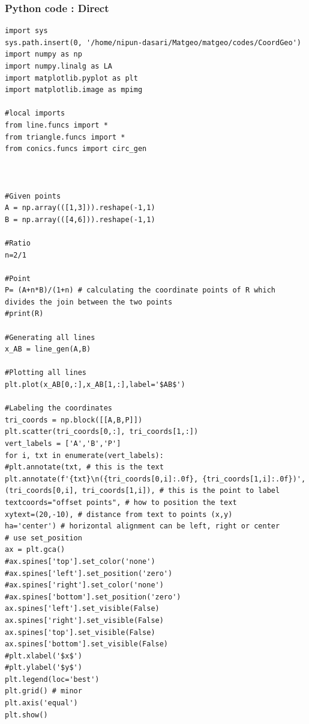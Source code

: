\documentclass{beamer}
\begin{document}
	\begin{frame}[fragile]
	\frametitle{Python code : Direct }
	
	\begin{lstlisting}
import sys                                          
sys.path.insert(0, '/home/nipun-dasari/Matgeo/matgeo/codes/CoordGeo')       
import numpy as np
import numpy.linalg as LA
import matplotlib.pyplot as plt
import matplotlib.image as mpimg

#local imports
from line.funcs import *
from triangle.funcs import *
from conics.funcs import circ_gen



#Given points
A = np.array(([1,3])).reshape(-1,1)
B = np.array(([4,6])).reshape(-1,1)

#Ratio
n=2/1

#Point
P= (A+n*B)/(1+n) # calculating the coordinate points of R which divides the join between the two points
#print(R)

#Generating all lines
x_AB = line_gen(A,B)

#Plotting all lines
plt.plot(x_AB[0,:],x_AB[1,:],label='$AB$')

#Labeling the coordinates
tri_coords = np.block([[A,B,P]])
plt.scatter(tri_coords[0,:], tri_coords[1,:])
vert_labels = ['A','B','P']
for i, txt in enumerate(vert_labels):
#plt.annotate(txt, # this is the text
plt.annotate(f'{txt}\n({tri_coords[0,i]:.0f}, {tri_coords[1,i]:.0f})',
(tri_coords[0,i], tri_coords[1,i]), # this is the point to label
textcoords="offset points", # how to position the text
xytext=(20,-10), # distance from text to points (x,y)
ha='center') # horizontal alignment can be left, right or center
# use set_position
ax = plt.gca()
#ax.spines['top'].set_color('none')
#ax.spines['left'].set_position('zero')
#ax.spines['right'].set_color('none')
#ax.spines['bottom'].set_position('zero')
ax.spines['left'].set_visible(False)
ax.spines['right'].set_visible(False)
ax.spines['top'].set_visible(False)
ax.spines['bottom'].set_visible(False)
#plt.xlabel('$x$')
#plt.ylabel('$y$')
plt.legend(loc='best')
plt.grid() # minor
plt.axis('equal')
plt.show()
	\end{lstlisting}
\end{frame}
\end{document}
